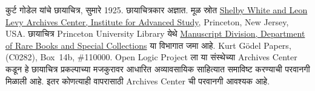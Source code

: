 कुर्ट गोडेल यांचे छायाचित्र, सुमारे 1925. छायाचित्रकार अज्ञात.
मूळ स्रोत \href{https://www.ias.edu/library/archives}{Shelby White and
Leon Levy Archives Center, Institute for Advanced Study},
Princeton, New Jersey, USA. छायाचित्र Princeton University Library
येथे \href{https://library.princeton.edu/services/special-collections}{Manuscript
Division, Department of Rare Books and Special Collections} या
विभागात जमा आहे. Kurt Gödel Papers, (C0282), Box~14b, \#110000.
Open Logic Project ला या संस्थेच्या Archives Center कडून हे
छायाचित्र प्रकल्पाच्या मजकुरावर आधारित अव्यावसायिक साहित्यात
समाविष्ट करण्याची परवानगी मिळाली आहे. इतर कोणत्याही वापरासाठी
Archives Center ची परवानगी आवश्यक आहे.
